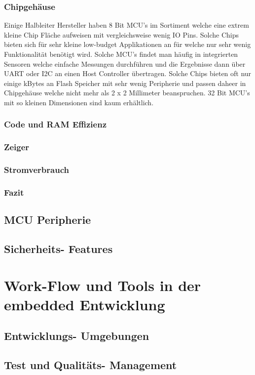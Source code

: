 \documentclass[MES,Master,ngerman]{twbook}%
\begin{document}
\subsubsection{Chipgehäuse}
Einige Halbleiter Hersteller haben 8 Bit MCU's im Sortiment welche eine extrem kleine Chip Fläche aufweisen mit vergleichsweise wenig IO Pins. Solche Chips bieten sich für sehr kleine low-budget Applikationen an für welche nur sehr wenig Funktionalität benötigt wird. Solche MCU's findet man häufig in integrierten Sensoren welche einfache Messungen durchführen und die Ergebnisse dann über UART oder I2C an einen Host Controller übertragen. Solche Chips bieten oft nur einige kBytes an Flash Speicher mit sehr wenig Peripherie und passen daheer in Chipgehäuse welche nicht mehr als 2 x 2 Millimeter beanspruchen. 32 Bit MCU's mit so kleinen Dimensionen sind kaum erhältlich. 
\subsubsection{Code und RAM Effizienz}
\subsubsection{Zeiger}
\subsubsection{Stromverbrauch}
\subsubsection{Fazit}
\subsection{MCU Peripherie}
\subsection{Sicherheits- Features}
\section{Work-Flow und Tools in der embedded Entwicklung}
\subsection{Entwicklungs- Umgebungen}
\subsection{Test und Qualitäts- Management}
\end{document}
